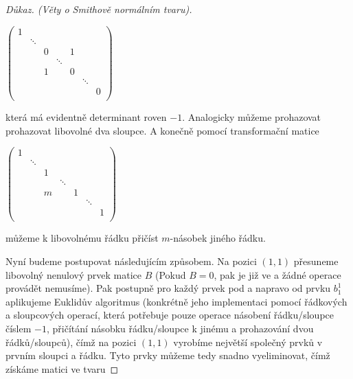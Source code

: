 \begin{proof}[Důkaz. (Věty o Smithově normálním tvaru)]
\begin{center}
$
    \begin{pmatrix}
        1       &        &        &        &        &        &        \\
                & \ddots &        &        &        &        &        \\
                &        & 0      &        & 1      &        &        \\
                &        &        & \ddots &        &        &        \\
                &        & 1      &        & 0      &        &        \\
                &        &        &        &        & \ddots &        \\
                &        &        &        &        &        & 0      \\
    \end{pmatrix}
$
\end{center}
která má evidentně determinant roven $ -1 $. Analogicky můžeme prohazovat
prohazovat libovolné dva sloupce. A konečně pomocí transformační matice
\begin{center}
$
    \begin{pmatrix}
        1       &        &        &        &        &        &        \\
                & \ddots &        &        &        &        &        \\
                &        & 1      &        &        &        &        \\
                &        &        & \ddots &        &        &        \\
                &        & m      &        & 1      &        &        \\
                &        &        &        &        & \ddots &        \\
                &        &        &        &        &        & 1      \\
    \end{pmatrix}
$
\end{center}
můžeme k libovolnému řádku přičíst $ m $-násobek jiného řádku.

Nyní budeme postupovat následujícím způsobem. Na pozici $ (1, 1) $ přesuneme libovolný
nenulový prvek matice $ B $ (Pokud $ B = 0 $, pak je již ve \snf a žádné operace
provádět nemusíme). Pak postupně pro každý prvek pod a napravo od prvku $ b_1^1 $
aplikujeme Euklidův algoritmus (konkrétně jeho implementaci pomocí řádkových a
sloupcových operací, která potřebuje pouze operace násobení řádku/sloupce číslem $ -1 $,
přičítání násobku řádku/sloupce k jinému a prohazování dvou řádků/sloupců),
čímž na pozici $ (1, 1) $ vyrobíme největší společný prvků
v prvním sloupci a řádku. Tyto prvky můžeme tedy snadno vyeliminovat, čímž získáme
matici ve tvaru


\end{proof}
